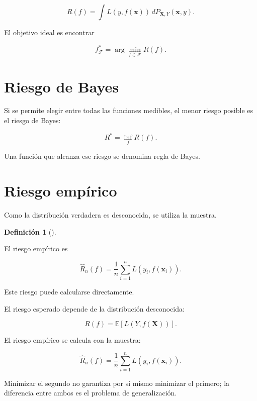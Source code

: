 \documentclass[
  spanish,
  10.5pt,
  letterpaper,
  DIV=11,
  numbers=noendperiod,
  oneside,
  open=any]{scrreprt}
\theoremstyle{definition}
\newtheorem{definition}{Definición}[chapter]
\theoremstyle{definition}
\theoremstyle{plain}
\theoremstyle{remark}
\begin{document}
\[
R(f)
=
\int
L(
y,
f(\mathbf{x})
)
\,dP_{\mathbf{X},Y}(\mathbf{x},y).
\]

El objetivo ideal es encontrar

\[
f^{*}_{\mathcal{F}}
=
\arg\min_{f\in\mathcal{F}}
R(f).
\]

\section*{Riesgo de Bayes}\label{riesgo-de-bayes}


Si se permite elegir entre todas las funciones medibles, el menor riesgo
posible es el riesgo de Bayes:

\[
R^{*}
=
\inf_f R(f).
\]

Una función que alcanza ese riesgo se denomina regla de Bayes.

\section*{Riesgo empírico}\label{riesgo-empuxedrico-1}


Como la distribución verdadera es desconocida, se utiliza la muestra.

\begin{definition}[]\protect\hypertarget{def-riesgo-empirico}{}\label{def-riesgo-empirico}

El riesgo empírico es

\[
\widehat{R}_n(f)
=
\frac{1}{n}
\sum_{i=1}^{n}
L(
y_i,
f(\mathbf{x}_i)
).
\]

\end{definition}

Este riesgo puede calcularse directamente.

\begin{tcolorbox}[enhanced jigsaw, arc=.35mm, bottomrule=.15mm, bottomtitle=1mm, breakable, colback=white, colbacktitle=quarto-callout-note-color!10!white, colframe=quarto-callout-note-color-frame, coltitle=black, left=2mm, leftrule=.75mm, opacityback=0, opacitybacktitle=0.6, rightrule=.15mm, title=\textcolor{quarto-callout-note-color}{\faInfo}\hspace{0.5em}{Riesgo esperado y riesgo empírico}, titlerule=0mm, toprule=.15mm, toptitle=1mm]

El riesgo esperado depende de la distribución desconocida:

\[
R(f)=\mathbb{E}[L(Y,f(\mathbf{X}))].
\]

El riesgo empírico se calcula con la muestra:

\[
\widehat{R}_n(f)
=
\frac{1}{n}\sum_{i=1}^{n}L(y_i,f(\mathbf{x}_i)).
\]

Minimizar el segundo no garantiza por sí mismo minimizar el primero; la
diferencia entre ambos es el problema de generalización.

\end{tcolorbox}
\end{document}
